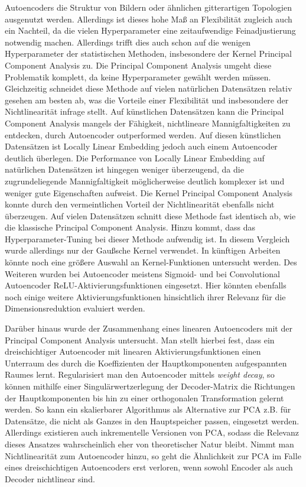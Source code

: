 Autoencoders die Struktur von Bildern oder ähnlichen gitterartigen Topologien ausgenutzt werden.
Allerdings ist dieses hohe Maß an Flexibilität zugleich auch ein Nachteil, da die vielen
Hyperparameter eine zeitaufwendige Feinadjustierung notwendig machen. Allerdings trifft dies auch
schon auf die wenigen Hyperparameter der statistischen Methoden, insbesondere der Kernel Principal
Component Analysis zu. Die Principal Component Analysis umgeht diese Problematik komplett, da keine
Hyperparameter gewählt werden müssen. Gleichzeitig schneidet diese Methode auf vielen natürlichen
Datensätzen relativ gesehen am besten ab, was die Vorteile einer Flexibilität und insbesondere der
Nichtlinearität infrage stellt. Auf künstlichen Datensätzen kann die Principal Component Analysis
mangels der Fähigkeit, nichtlineare Mannigfaltigkeiten zu entdecken, durch Autoencoder outperformed
werden. Auf diesen künstlichen Datensätzen ist Locally Linear Embedding jedoch auch einem
Autoencoder deutlich überlegen. Die Performance von Locally Linear Embedding auf natürlichen
Datensätzen ist hingegen weniger überzeugend, da die zugrundeliegende Mannigfaltigkeit
möglicherweise deutlich komplexer ist und weniger gute Eigenschaften aufweist. Die Kernel Principal
Component Analysis konnte durch den vermeintlichen Vorteil der Nichtlinearität ebenfalls nicht
überzeugen. Auf vielen Datensätzen schnitt diese Methode fast identisch ab, wie die klassische
Principal Component Analysis. Hinzu kommt, dass das Hyperparameter-Tuning bei dieser Methode
aufwendig ist. In diesem Vergleich wurde allerdings nur der Gaußsche Kernel verwendet. In künftigen
Arbeiten könnte noch eine größere Auswahl an Kernel-Funktionen untersucht werden. Des Weiteren
wurden bei Autoencoder meistens Sigmoid- und bei Convolutional Autoencoder
ReLU-Aktivierungsfunktionen eingesetzt. Hier könnten ebenfalls noch einige weitere
Aktivierungsfunktionen hinsichtlich ihrer Relevanz für die Dimensionsreduktion evaluiert werden.

Darüber hinaus wurde der Zusammenhang eines linearen Autoencoders mit der Principal Component
Analysis untersucht. Man stellt hierbei fest, dass ein dreischichtiger Autoencoder mit linearen
Aktivierungsfunktionen einen Unterraum des durch die Koeffizienten der Hauptkomponenten
aufgespannten Raumes lernt. Regularisiert man den Autoencoder mittels \textit{weight decay}, so
können mithilfe einer Singulärwertzerlegung der Decoder-Matrix die Richtungen der Hauptkomponenten
bis hin zu einer orthogonalen Transformation gelernt werden. So kann ein skalierbarer Algorithmus
als Alternative zur PCA z.B. für Datensätze, die nicht als Ganzes in den Hauptspeicher passen,
eingesetzt werden. Allerdings existieren auch inkrementelle Versionen von PCA, sodass die Relevanz
dieses Ansatzes wahrscheinlich eher von theoretischer Natur bleibt. Nimmt man Nichtlinearität zum
Autoencoder hinzu, so geht die Ähnlichkeit zur PCA im Falle eines dreischichtigen Autoencoders erst
verloren, wenn sowohl Encoder als auch Decoder nichtlinear sind.

